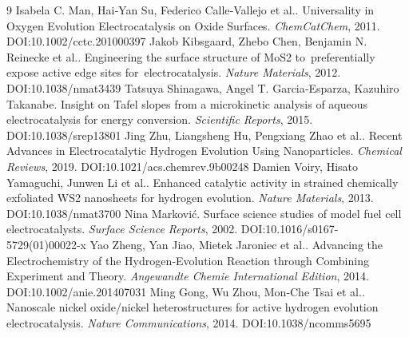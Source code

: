 \documentclass[11pt]{article}
\begin{document}
\begin{thebibliography}{9}
 Isabela C. Man, Hai‐Yan Su, Federico Calle‐Vallejo et al.. Universality in Oxygen Evolution Electrocatalysis on Oxide Surfaces. \emph{ChemCatChem}, 2011. DOI:10.1002/cctc.201000397
 Jakob Kibsgaard, Zhebo Chen, Benjamin N. Reinecke et al.. Engineering the surface structure of MoS2 to preferentially expose active edge sites for electrocatalysis. \emph{Nature Materials}, 2012. DOI:10.1038/nmat3439
 Tatsuya Shinagawa, Angel T. Garcia‐Esparza, Kazuhiro Takanabe. Insight on Tafel slopes from a microkinetic analysis of aqueous electrocatalysis for energy conversion. \emph{Scientific Reports}, 2015. DOI:10.1038/srep13801
 Jing Zhu, Liangsheng Hu, Pengxiang Zhao et al.. Recent Advances in Electrocatalytic Hydrogen Evolution Using Nanoparticles. \emph{Chemical Reviews}, 2019. DOI:10.1021/acs.chemrev.9b00248
 Damien Voiry, Hisato Yamaguchi, Junwen Li et al.. Enhanced catalytic activity in strained chemically exfoliated WS2 nanosheets for hydrogen evolution. \emph{Nature Materials}, 2013. DOI:10.1038/nmat3700
 Nina Marković. Surface science studies of model fuel cell electrocatalysts. \emph{Surface Science Reports}, 2002. DOI:10.1016/s0167-5729(01)00022-x
 Yao Zheng, Yan Jiao, Mietek Jaroniec et al.. Advancing the Electrochemistry of the Hydrogen‐Evolution Reaction through Combining Experiment and Theory. \emph{Angewandte Chemie International Edition}, 2014. DOI:10.1002/anie.201407031
 Ming Gong, Wu Zhou, Mon‐Che Tsai et al.. Nanoscale nickel oxide/nickel heterostructures for active hydrogen evolution electrocatalysis. \emph{Nature Communications}, 2014. DOI:10.1038/ncomms5695
\end{thebibliography}
\end{document}
